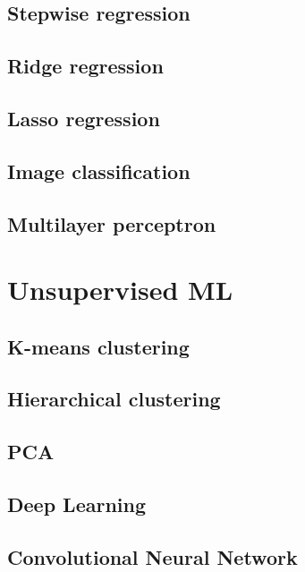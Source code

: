 \documentclass[11pt,fleqn]{book} %
\begin{document}
\chapter{Stepwise regression}
\chapter{Ridge regression}
\chapter{Lasso regression}
\chapter{Image classification}
\chapter{Multilayer perceptron}

\part{Unsupervised ML}


\chapter{K-means clustering}
\chapter{Hierarchical clustering}
\chapter{PCA}
\chapter{Deep Learning}
\chapter{Convolutional Neural Network}
\end{document}
